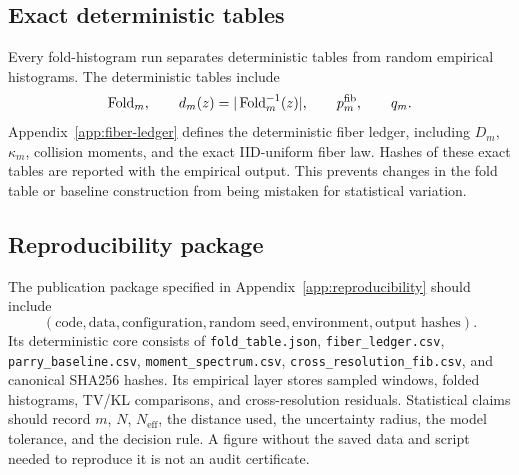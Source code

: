 \subsection{Exact deterministic tables}
Every fold-histogram run separates deterministic tables from random empirical histograms.  The deterministic tables include
\[
\operatorname{Fold}_m,\qquad
d_m(z)=|\operatorname{Fold}_m^{-1}(z)|,\qquad
p_m^{\mathrm{fib}},\qquad
q_m.
\]
Appendix~\ref{app:fiber-ledger} defines the deterministic fiber ledger, including \(D_m\), \(\kappa_m\), collision moments, and the exact IID-uniform fiber law.  Hashes of these exact tables are reported with the empirical output.  This prevents changes in the fold table or baseline construction from being mistaken for statistical variation.

\subsection{Reproducibility package}
The publication package specified in Appendix~\ref{app:reproducibility} should include
\[
(\text{code},\text{data},\text{configuration},\text{random seed},\text{environment},\text{output hashes}).
\]
Its deterministic core consists of \texttt{fold\_table.json}, \texttt{fiber\_ledger.csv}, \texttt{parry\_baseline.csv}, \texttt{moment\_spectrum.csv}, \texttt{cross\_resolution\_fib.csv}, and canonical SHA256 hashes.  Its empirical layer stores sampled windows, folded histograms, TV/KL comparisons, and cross-resolution residuals.  Statistical claims should record \(m\), \(N\), \(N_{\mathrm{eff}}\), the distance used, the uncertainty radius, the model tolerance, and the decision rule.  A figure without the saved data and script needed to reproduce it is not an audit certificate.

